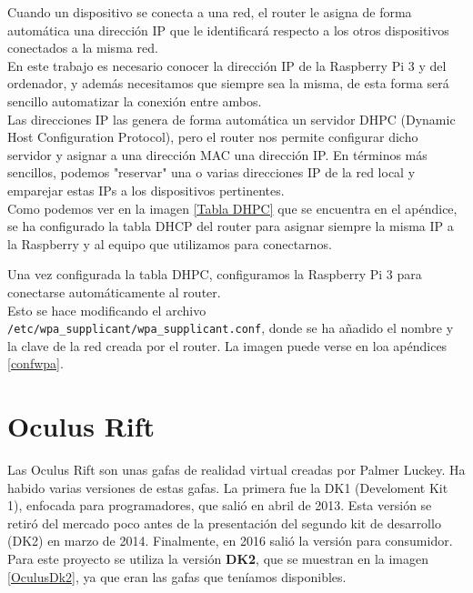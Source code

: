 \documentclass[twoside, 11pt]{epstfg}
\begin{document}
Cuando un dispositivo se conecta a una red, el router le asigna de forma automática una dirección IP que le identificará respecto a los otros dispositivos conectados a la misma red.\\
En este trabajo es necesario conocer la dirección IP de la Raspberry Pi 3 y del ordenador, y además necesitamos que siempre sea la misma, de esta forma será sencillo automatizar la conexión entre ambos.\\
Las direcciones IP las genera de forma automática un servidor DHPC (Dynamic Host Configuration Protocol), pero el router nos permite configurar dicho servidor y asignar a una dirección MAC una dirección IP. En términos más sencillos, podemos "reservar" una o varias direcciones IP de la red local y emparejar estas IPs a los dispositivos pertinentes.\\
Como podemos ver en la imagen \ref{Tabla DHPC} que se encuentra en el apéndice, se ha configurado la tabla DHCP del router para asignar siempre la misma IP a la Raspberry y al equipo que utilizamos para conectarnos.

Una vez configurada la tabla DHPC, configuramos la Raspberry Pi 3 para conectarse automáticamente al router.\\
Esto se hace modificando el archivo \texttt{/etc/wpa\_supplicant/wpa\_supplicant.conf}, donde se ha añadido el nombre y la clave de la red creada por el router. La imagen puede verse en loa apéndices \ref{confwpa}. 

\section{Oculus Rift}

Las Oculus Rift son unas gafas de realidad virtual creadas por Palmer Luckey.
Ha habido varias versiones de estas gafas.
La primera fue la DK1 (Develoment Kit 1), enfocada para programadores, que salió en abril de 2013. Esta versión se retiró del mercado poco antes de la presentación del segundo kit de desarrollo (DK2) en marzo de 2014.
Finalmente, en 2016 salió la versión para consumidor.\\
Para este proyecto se utiliza la versión \textbf{DK2}, que se muestran en la imagen \ref{OculusDk2}, ya que eran las gafas que teníamos disponibles.

\end{document}
